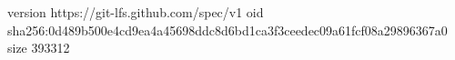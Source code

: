 version https://git-lfs.github.com/spec/v1
oid sha256:0d489b500e4cd9ea4a45698ddc8d6bd1ca3f3ceedec09a61fcf08a29896367a0
size 393312
